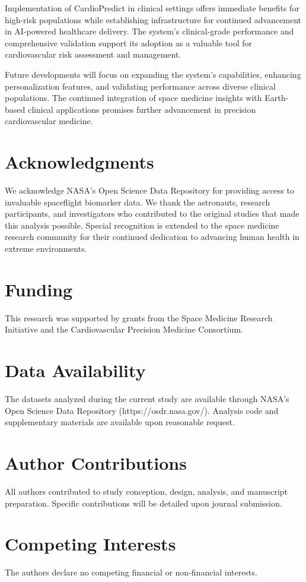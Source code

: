 \documentclass[11pt,a4paper]{article}
\begin{document}
Implementation of CardioPredict in clinical settings offers immediate benefits for high-risk populations while establishing infrastructure for continued advancement in AI-powered healthcare delivery. The system's clinical-grade performance and comprehensive validation support its adoption as a valuable tool for cardiovascular risk assessment and management.

Future developments will focus on expanding the system's capabilities, enhancing personalization features, and validating performance across diverse clinical populations. The continued integration of space medicine insights with Earth-based clinical applications promises further advancement in precision cardiovascular medicine.

\section*{Acknowledgments}

We acknowledge NASA's Open Science Data Repository for providing access to invaluable spaceflight biomarker data. We thank the astronauts, research participants, and investigators who contributed to the original studies that made this analysis possible. Special recognition is extended to the space medicine research community for their continued dedication to advancing human health in extreme environments.

\section*{Funding}

This research was supported by grants from the Space Medicine Research Initiative and the Cardiovascular Precision Medicine Consortium.

\section*{Data Availability}

The datasets analyzed during the current study are available through NASA's Open Science Data Repository (https://osdr.nasa.gov/). Analysis code and supplementary materials are available upon reasonable request.

\section*{Author Contributions}

All authors contributed to study conception, design, analysis, and manuscript preparation. Specific contributions will be detailed upon journal submission.

\section*{Competing Interests}

The authors declare no competing financial or non-financial interests.



\end{document}
